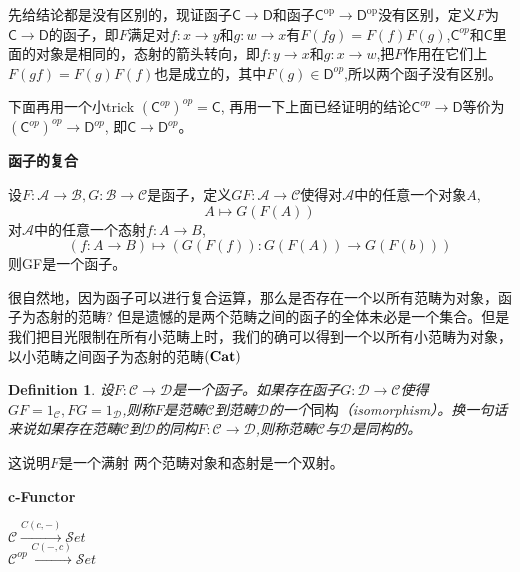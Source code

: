 \documentclass[UTF8,11pt,a4paper]{ctexart}
\newtheorem{definition}[theorem]{Definition}
\newcommand{\sC}{\mathsf{C}}
\newcommand{\sD}{\mathsf{D}}
\newcommand{\op}{\textrm{op}}
\newcommand*{\xfunc}[4]{{#2}\colon{#3}{#1}{#4}}
\newcommand*{\func}[3]{\xfunc{\to}{#1}{#2}{#3}}
\begin{document}
先给结论都是没有区别的，现证函子$\sC\to\sD$和函子$\sC^{\op}\to \sD^{\op}$没有区别，定义$F$为$\sC\to\sD$的函子，即$F$满足对$\func{f}{x}{y}$和$\func{g}{w}{x}$有$F(fg)=F(f)F(g)$,$\sC^{op}$和$\sC$里面的对象是相同的，态射的箭头转向，即$\func{f}{y}{x}$和$\func{g}{x}{w}$,把$F$作用在它们上$F(gf)=F(g)F(f)$也是成立的，其中$F(g) \in \sD^{op}$,所以两个函子没有区别。

下面再用一个小trick $({\sC^{op}})^{op}=\sC$, 再用一下上面已经证明的结论$\sC^{op}\to\sD$等价为$({\sC^{op}})^{op}\to\sD^{op}$, 即$\sC\to\sD^{op}$。

\begin{flushleft}
\textbf{函子的复合}
\end{flushleft}
设$F \colon \mathcal{A} \rightarrow \mathcal{B},G \colon \mathcal{B} \rightarrow \mathcal{C}$是函子，定义$GF \colon \mathcal{A} \rightarrow \mathcal{C}$使得对$\mathcal{A}$中的任意一个对象$A$,\[A \mapsto G(F(A))\]
对$\mathcal{A}$中的任意一个态射$f \colon A \rightarrow B$, \[(f \colon A \rightarrow B) \mapsto (G(F(f)) \colon G(F(A)) \rightarrow G(F(b))) \]则GF是一个函子。

很自然地，因为函子可以进行复合运算，那么是否存在一个以所有范畴为对象，函子为态射的范畴? 但是遗憾的是两个范畴之间的函子的全体未必是一个集合。但是我们把目光限制在所有小范畴上时，我们的确可以得到一个以所有小范畴为对象，以小范畴之间函子为态射的范畴$\bf(Cat)$

\begin{definition}
设$F \colon \mathcal{C} \rightarrow \mathcal{D}$是一个函子。如果存在函子$G \colon \mathcal{D} \rightarrow \mathcal{C}$使得$GF=1_{\mathcal{C}},FG = 1_{\mathcal{D}}$,则称$F$是范畴$\mathcal{C}$到范畴$\mathcal{D}$的一个$\textbf{同构}$（isomorphism）。换一句话来说如果存在范畴$\mathcal{C}$到$\mathcal{D}$的同构$F \colon \mathcal{C} \rightarrow \mathcal{D}$,则称范畴$\mathcal{C}$与$\mathcal{D}$是同构的。
\end{definition}
这说明$F$是一个满射
两个范畴对象和态射是一个双射。


\begin{flushleft}
\textbf{c-Functor} \\
\begin{center}
$\mathcal{C} \xrightarrow{C(c,-)} \mathcal{S}et$ \\
$\mathcal{C}^{op} \xrightarrow{C(-,c)} \mathcal{S}et$ \\
\end{center}
\end{flushleft}
\end{document}
